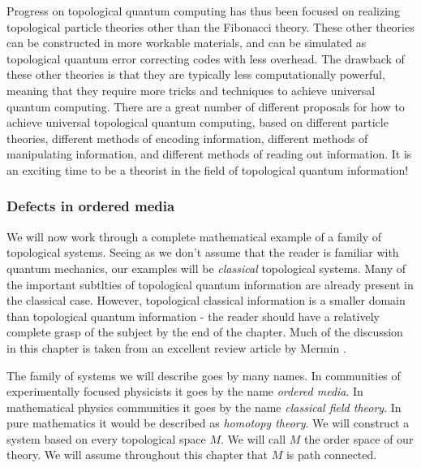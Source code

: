 Progress on topological quantum computing has thus been focused on realizing topological particle theories other than the Fibonacci theory. These other theories can be constructed in more workable materials, and can be simulated as topological quantum error correcting codes with less overhead. The drawback of these other theories is that they are typically less computationally powerful, meaning that they require more tricks and techniques to achieve universal quantum computing. There are a great number of different proposals for how to achieve universal topological quantum computing, based on different particle theories, different methods of encoding information, different methods of manipulating information, and different methods of reading out information. It is an exciting time to be a theorist in the field of topological quantum information!

\subsubsection{Defects in ordered media}

We will now work through a complete mathematical example of a family of topological systems. Seeing as we don't assume that the reader is familiar with quantum mechanics, our examples will be \textit{classical} topological systems. Many of the important subtlties of topological quantum information are already present in the classical case. However, topological classical information is a smaller domain than topological quantum information - the reader should have a relatively complete grasp of the subject by the end of the chapter. Much of the discussion in this chapter is taken from an excellent review article by Mermin \cite{mermin1979topological}.

The family of systems we will describe goes by many names. In communities of experimentally focused physicists it goes by the name \textit{ordered media}. In mathematical physics communities it goes by the name \textit{classical field theory}. In pure mathematics it would be described as \textit{homotopy theory}. We will construct a system based on every topological space $M$. We will call $M$ the order space of our theory. We will assume throughout this chapter that $M$ is path connected.

